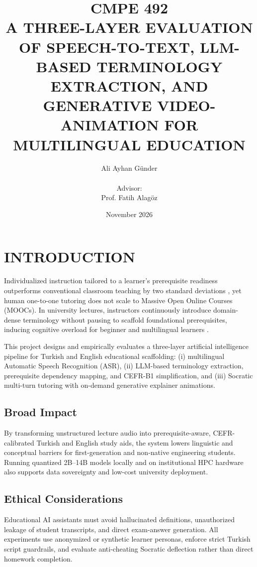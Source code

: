 \documentclass[a4paper,12pt]{report}
\begin{document}
\title{CMPE 492 \\ A THREE-LAYER EVALUATION OF SPEECH-TO-TEXT, LLM-BASED TERMINOLOGY EXTRACTION, AND GENERATIVE VIDEO-ANIMATION FOR MULTILINGUAL EDUCATION}
\author{
Ali Ayhan G{\"{u}}nder \\ \\
Advisor: \\
Prof. Fatih Alag{\"{o}}z
}
\date{November 2026}
\maketitle

\tableofcontents
\newpage

\chapter{INTRODUCTION}

Individualized instruction tailored to a learner's prerequisite readiness outperforms conventional classroom teaching by two standard deviations \cite{bloom1984}, yet human one-to-one tutoring does not scale to Massive Open Online Courses (MOOCs). In university lectures, instructors continuously introduce domain-dense terminology without pausing to scaffold foundational prerequisites, inducing cognitive overload for beginner and multilingual learners \cite{conde2016,xu2024}.

This project designs and empirically evaluates a three-layer artificial intelligence pipeline for Turkish and English educational scaffolding: (i) multilingual Automatic Speech Recognition (ASR), (ii) LLM-based terminology extraction, prerequisite dependency mapping, and CEFR-B1 simplification, and (iii) Socratic multi-turn tutoring with on-demand generative explainer animations.

\section{Broad Impact}
By transforming unstructured lecture audio into prerequisite-aware, CEFR-calibrated Turkish and English study aids, the system lowers linguistic and conceptual barriers for first-generation and non-native engineering students. Running quantized 2B--14B models locally and on institutional HPC hardware also supports data sovereignty and low-cost university deployment.

\section{Ethical Considerations}
Educational AI assistants must avoid hallucinated definitions, unauthorized leakage of student transcripts, and direct exam-answer generation. All experiments use anonymized or synthetic learner personas, enforce strict Turkish script guardrails, and evaluate anti-cheating Socratic deflection rather than direct homework completion.
\end{document}
